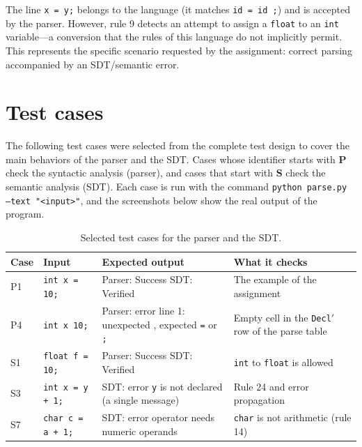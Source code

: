 \documentclass[12pt,letterpaper]{article}
\newcommand{\cod}[1]{\texttt{#1}} %
\newcommand{\anchotabla}{0.9\textwidth} %
\begin{document}
The line \texttt{x = y;} belongs to the language (it matches \texttt{id = id ;}) and is accepted by the parser. However, rule 9 detects an attempt to assign a \texttt{float} to an \texttt{int} variable—a conversion that the rules of this language do not implicitly permit. This represents the specific scenario requested by the assignment: correct parsing accompanied by an SDT/semantic error.

\section{Test cases}

The following test cases were selected from the complete test design to cover the main behaviors of the parser and the SDT. Cases whose identifier starts with \textbf{P} check the syntactic analysis (parser), and cases that start with \textbf{S} check the semantic analysis (SDT). Each case is run with the command \texttt{python parse.py --text "<input>"}, and the screenshots below show the real output of the program.

\begin{table}[H]
\centering
\small
\setlength{\tabcolsep}{4pt}
\renewcommand{\arraystretch}{1.25}
\begin{tabular}{@{}>{\raggedright\arraybackslash}p{0.08\dimexpr\anchotabla}
                  >{\raggedright\arraybackslash}p{0.24\dimexpr\anchotabla}
                  >{\raggedright\arraybackslash}p{0.36\dimexpr\anchotabla}
                  >{\raggedright\arraybackslash}p{0.32\dimexpr\anchotabla}@{}}
\toprule
\textbf{Case} & \textbf{Input} & \textbf{Expected output} & \textbf{What it checks} \\
\midrule
P1 & \cod{int x = 10;} & Parser: Success \newline SDT: Verified & The example of the assignment \\
P4 & \cod{int x 10;} & Parser: error \newline line 1: unexpected \cod{\textquotesingle 10\textquotesingle}, expected \cod{\textquotesingle =\textquotesingle} or \cod{\textquotesingle ;\textquotesingle} & Empty cell in the \cod{Decl$'$} row of the parse table \\
S1 & \cod{float f = 10;} & Parser: Success \newline SDT: Verified & \cod{int} to \cod{float} is allowed \\
S3 & \cod{int x = y + 1;} & SDT: error \newline \cod{\textquotesingle y\textquotesingle} is not declared (a single message) & Rule 24 and error propagation \\
S7 & \cod{char c = \textquotesingle a\textquotesingle{} + 1;} & SDT: error \newline operator needs numeric operands & \cod{char} is not arithmetic (rule 14) \\
\bottomrule
\end{tabular}
\caption{Selected test cases for the parser and the SDT.}
\end{table}
\end{document}
